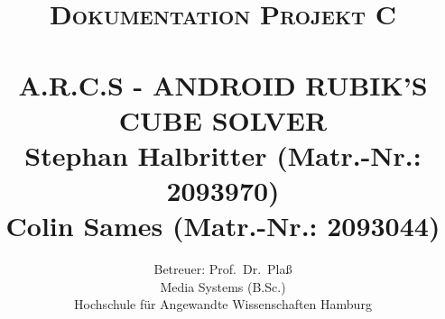 

\title{\normalsize \textsc{Dokumentation Projekt C} 	%
		 	\\[2.0cm]													%
            \HRule{0.5pt} \\ [0.5cm]										%
			\LARGE \textbf{\uppercase{A.R.C.S - Android Rubik's Cube Solver}}	%
			\HRule{0.5pt} \\ [0.5cm]								%
			\large Stephan Halbritter (Matr.-Nr.: 2093970)\\
      Colin Sames (Matr.-Nr.: 2093044)\\
		}

\author{Betreuer: Prof.~Dr.~Plaß\\
    Media Systems (B.Sc.)\\
    Hochschule für Angewandte Wissenschaften Hamburg\\
}
